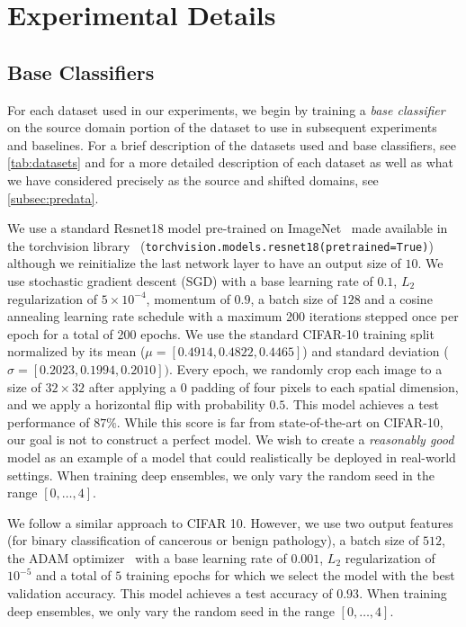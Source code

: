 \section{Experimental Details}
\label{sec:expdet}

\subsection{Base Classifiers}
\label{subsec:basclf}
For each dataset used in our experiments, we begin by training a \textit{base classifier} on the source domain portion of the dataset to use in subsequent experiments and baselines.
For a brief description of the datasets used and base classifiers, see \autoref{tab:datasets} and for a more detailed description of each dataset as well as what we have considered precisely as the source and shifted domains, see \autoref{subsec:predata}.

We use a standard Resnet18 model pre-trained on ImageNet~\citep{deng2009imagenet} made available in the torchvision library~\citep{torchvision} (\verb!torchvision.models.resnet18(pretrained=True)!) although we reinitialize the last network layer to have an output size of $10$.
We use stochastic gradient descent (SGD) with a base learning rate of $0.1$, $L_2$ regularization of $5\times 10^{-4}$, momentum of $0.9$, a batch size of $128$ and a cosine annealing learning rate schedule with a maximum 200 iterations stepped once per epoch for a total of 200 epochs.
We use the standard CIFAR-10 training split normalized by its mean ($\mu=[0.4914, 0.4822, 0.4465]$) and standard deviation ($\sigma=[0.2023, 0.1994, 0.2010])$.
Every epoch, we randomly crop each image to a size of $32\times 32$ after applying a $0$ padding of four pixels to each spatial dimension, and we apply a horizontal flip with probability $0.5$.
This model achieves a test performance of $87\%$.
While this score is far from state-of-the-art on CIFAR-10, our goal is not to construct a perfect model.
We wish to create a \textit{reasonably good} model as an example of a model that could realistically be deployed in real-world settings.
When training deep ensembles, we only vary the random seed in the range $[0,\ldots ,4]$.

We follow a similar approach to CIFAR 10.
However, we use two output features (for binary classification of cancerous or benign pathology), a batch size of $512$, the ADAM optimizer~\citep{DBLP:journals/corr/KingmaB14} with a base learning rate of $0.001$, $L_2$ regularization of $10^{-5}$ and a total of $5$ training epochs for which we select the model with the best validation accuracy.
This model achieves a test accuracy of $0.93$.
When training deep ensembles, we only vary the random seed in the range $[0,\dots,4]$.

